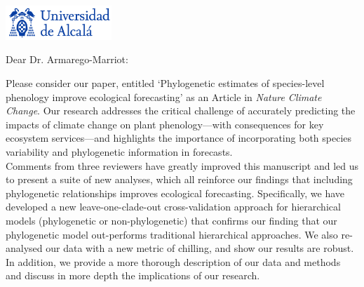\documentclass[11pt,a4paper]{letter}
\begin{document}
\begin{letter}{}
\includegraphics[width=0.3\textwidth]{logo_uah.png}

\opening{Dear Dr. Armarego-Marriot:} %

\noindent Please consider our paper, entitled `Phylogenetic estimates of species-level phenology improve ecological forecasting' as an Article in \emph{Nature Climate Change}. Our research addresses the critical challenge of accurately predicting the impacts of climate change on plant phenology---with consequences for key ecosystem services---and highlights the importance of incorporating both species variability and phylogenetic information in forecasts.
\vspace{1.5ex}\\
Comments from three reviewers have greatly improved this manuscript and led us to present a suite of new analyses, which all reinforce our findings that including phylogenetic relationships improves ecological forecasting. Specifically, we have developed a new leave-one-clade-out cross-validation approach for hierarchical models (phylogenetic or non-phylogenetic) that confirms our finding that our phylogenetic model out-performs traditional hierarchical approaches. We also re-analysed our data with a new metric of chilling, and show our results are robust. In addition, we provide a more thorough description of our data and methods and discuss in more depth the implications of our research. 
\vspace{1.5ex}\\ %

\end{letter}
\end{document}
